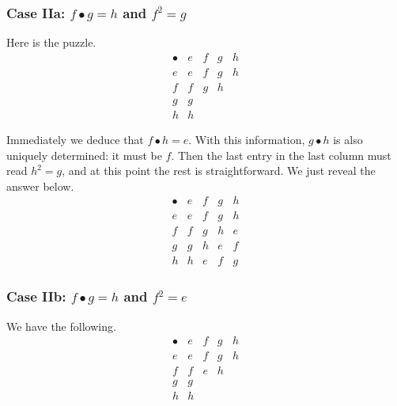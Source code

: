 \begin{solution}
	\subsubsection*{Case IIa: $f\bullet g = h$ and $f^2 = g$}
	Here is the puzzle.
	{%
		\renewcommand{\arraystretch}{1.5}
		\[
		\begin{array}{c||c|c|c|c}
			\bullet & e & f & g & h\\
			\hline
			\hline
			e & e & f & g & h\\
			\hline
			f & f &g & h & \\
			\hline
			g & g & &  & \\
			\hline
			h & h &   &  & 
		\end{array}
		\]
	}

	Immediately we deduce that $f\bullet h = e$. With this information, $g\bullet h$ is also uniquely determined: it must be $f$. Then the last entry in the last column must read $h^2 = g$, and at this point the rest is straightforward. We just reveal the answer below.
	{%
		\renewcommand{\arraystretch}{1.5}
		\[
		\begin{array}{c||c|c|c|c}
			\bullet & e & f & g & h\\
			\hline
			\hline
			e & e & f & g & h\\
			\hline
			f & f & g & h & e\\
			\hline
			g & g & h& e & f\\
			\hline
			h & h & e  & f & g
		\end{array}
		\]
	}
	\subsubsection*{Case IIb: $f\bullet g = h$ and $f^2 = e$}
	We have the following.
	{%
		\renewcommand{\arraystretch}{1.5}
		\[
		\begin{array}{c||c|c|c|c}
			\bullet & e & f & g & h\\
			\hline
			\hline
			e & e & f & g & h\\
			\hline
			f & f &e & h & \\
			\hline
			g & g & &  & \\
			\hline
			h & h &   &  & 
		\end{array}
		\]
	}
	

\end{solution}
